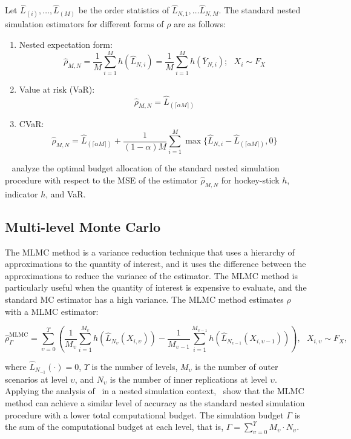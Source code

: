 Let $\hat{L}_{(i)}, \dots, \hat{L}_{(M)}$ be the order statistics of $\hat{L}_{N, 1}, \dots \hat{L}_{N, M}$. 
The standard nested simulation estimators for different forms of $\rho$ are as follows:

\begin{enumerate}
    \item   Nested expectation form:
            $$\hat{\rho}_{M, N} = \frac{1}{M} \sum_{i=1}^M h(\hat{L}_{N, i}) = \frac{1}{M} \sum_{i=1}^M h(\bar{Y}_{N, i}); ~~~ X_i \sim F_X$$
    \item   Value at risk (VaR):
            $$\hat{\rho}_{M, N} = \hat{L}_{(\lceil \alpha M \rceil)}$$
    \item   CVaR:
            \begin{equation} \label{eq1:cvar-hat}
                \hat{\rho}_{M, N} = \hat{L}_{(\lceil \alpha M \rceil)} + \frac{1}{(1-\alpha) M} \sum_{i=1}^M \max \{\hat{L}_{N, i} - \hat{L}_{(\lceil \alpha M \rceil)}, 0 \}
            \end{equation}
\end{enumerate}

~\cite{gordy2010nested} analyze the optimal budget allocation of the standard nested simulation procedure with respect to the MSE of the estimator $\hat{\rho}_{M, N}$ for hockey-stick $h$, indicator $h$, and VaR.


\subsection{Multi-level Monte Carlo}

The MLMC method is a variance reduction technique that uses a hierarchy of approximations to the quantity of interest, and it uses the difference between the approximations to reduce the variance of the estimator.
The MLMC method is particularly useful when the quantity of interest is expensive to evaluate, and the standard MC estimator has a high variance.
The MLMC method estimates $\rho$ with a MLMC estimator:

\begin{equation*}
    \hat{\rho}^{\text{MLMC}}_\Gamma = \sum_{\upsilon=0}^{\Upsilon} \left( \frac{1}{M_{\upsilon}} \sum_{i=1}^{M_{\upsilon}} h(\hat{L}_{N_{\upsilon}}(X_{i, \upsilon})) - \frac{1}{M_{\upsilon-1}} \sum_{i=1}^{M_{\upsilon-1}} h(\hat{L}_{N_{\upsilon-1}}(X_{i, \upsilon-1})) \right), ~~~ X_{i, \upsilon} \sim F_X,
\end{equation*}

where $\hat{L}_{N_{-1}}(\cdot) = 0$, $\Upsilon$ is the number of levels, $M_{\upsilon}$ is the number of outer scenarios at level $\upsilon$, and $N_{\upsilon}$ is the number of inner replications at level $\upsilon$.
Applying the analysis of~\cite{giles2015multilevel} in a nested simulation context,~\cite{giles2019multilevel} show that the MLMC method can achieve a similar level of accuracy as the standard nested simulation procedure with a lower total computational budget.
The simulation budget $\Gamma$ is the sum of the computational budget at each level, that is, $\Gamma = \sum_{\upsilon=0}^{\Upsilon} M_{\upsilon} \cdot N_{\upsilon}$.

